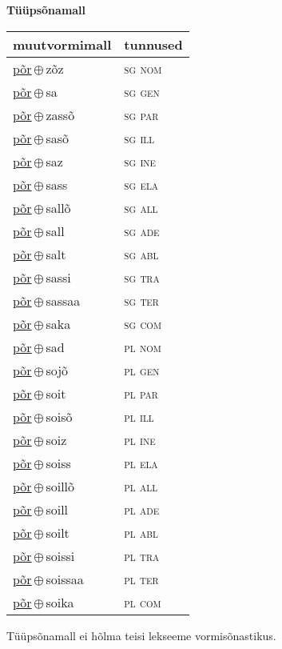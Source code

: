 

\vspace{3.5em}
\noindent \begin{minipage}{\textwidth}
\noindent \textbf{Tüüpsõnamall \,}\\

\begin{sideways}
\begin{tabular}{l l}
muutvormimall & tunnused \\
\hline
\underline{põr}\,$\oplus$\,zõz & \textsc{ sg nom } \\
\underline{põr}\,$\oplus$\,sa & \textsc{ sg gen } \\
\underline{põr}\,$\oplus$\,zassõ & \textsc{ sg par } \\
\underline{põr}\,$\oplus$\,sasõ & \textsc{ sg ill } \\
\underline{põr}\,$\oplus$\,saz & \textsc{ sg ine } \\
\underline{põr}\,$\oplus$\,sass & \textsc{ sg ela } \\
\underline{põr}\,$\oplus$\,sallõ & \textsc{ sg all } \\
\underline{põr}\,$\oplus$\,sall & \textsc{ sg ade } \\
\underline{põr}\,$\oplus$\,salt & \textsc{ sg abl } \\
\underline{põr}\,$\oplus$\,sassi & \textsc{ sg tra } \\
\underline{põr}\,$\oplus$\,sassaa & \textsc{ sg ter } \\
\underline{põr}\,$\oplus$\,saka & \textsc{ sg com } \\
\underline{põr}\,$\oplus$\,sad & \textsc{ pl nom } \\
\underline{põr}\,$\oplus$\,sojõ & \textsc{ pl gen } \\
\underline{põr}\,$\oplus$\,soit & \textsc{ pl par } \\
\underline{põr}\,$\oplus$\,soisõ & \textsc{ pl ill } \\
\underline{põr}\,$\oplus$\,soiz & \textsc{ pl ine } \\
\underline{põr}\,$\oplus$\,soiss & \textsc{ pl ela } \\
\underline{põr}\,$\oplus$\,soillõ & \textsc{ pl all } \\
\underline{põr}\,$\oplus$\,soill & \textsc{ pl ade } \\
\underline{põr}\,$\oplus$\,soilt & \textsc{ pl abl } \\
\underline{põr}\,$\oplus$\,soissi & \textsc{ pl tra } \\
\underline{põr}\,$\oplus$\,soissaa & \textsc{ pl ter } \\
\underline{põr}\,$\oplus$\,soika & \textsc{ pl com } \\
\end{tabular}
\end{sideways}
\label{tab:tüüpsõnamall-põrzõz}

\end{minipage}

 
\vspace{1em}
\noindent Tüüpsõnamall  ei hõlma teisi lekseeme vormi\-sõnastikus.
